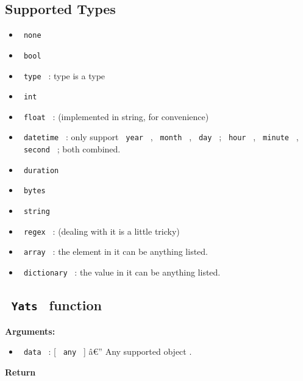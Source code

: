\subsection{Supported Types}\label{supported-types}

\begin{itemize}
\tightlist
\item
  \texttt{\ none\ }
\item
  \texttt{\ bool\ }
\item
  \texttt{\ type\ } : type is a type
\item
  \texttt{\ int\ }
\item
  \texttt{\ float\ } : (implemented in string, for convenience)
\item
  \texttt{\ datetime\ } : only support \texttt{\ year\ } ,
  \texttt{\ month\ } , \texttt{\ day\ } ; \texttt{\ hour\ } ,
  \texttt{\ minute\ } , \texttt{\ second\ } ; both combined.
\item
  \texttt{\ duration\ }
\item
  \texttt{\ bytes\ }
\item
  \texttt{\ string\ }
\item
  \texttt{\ regex\ } : (dealing with it is a little tricky)
\item
  \texttt{\ array\ } : the element in it can be anything listed.
\item
  \texttt{\ dictionary\ } : the value in it can be anything listed.
\end{itemize}

\subsection{\texorpdfstring{\texttt{\ Yats\ }
function}{ Yats  function}}\label{yats-function}

\begin{Shaded}
\begin{Highlighting}[]
\end{Highlighting}
\end{Shaded}

\textbf{Arguments:}

\begin{itemize}
\tightlist
\item
  \texttt{\ data\ } : {[} \texttt{\ any\ } {]} â€'' Any supported object
  .
\end{itemize}

\textbf{Return}

